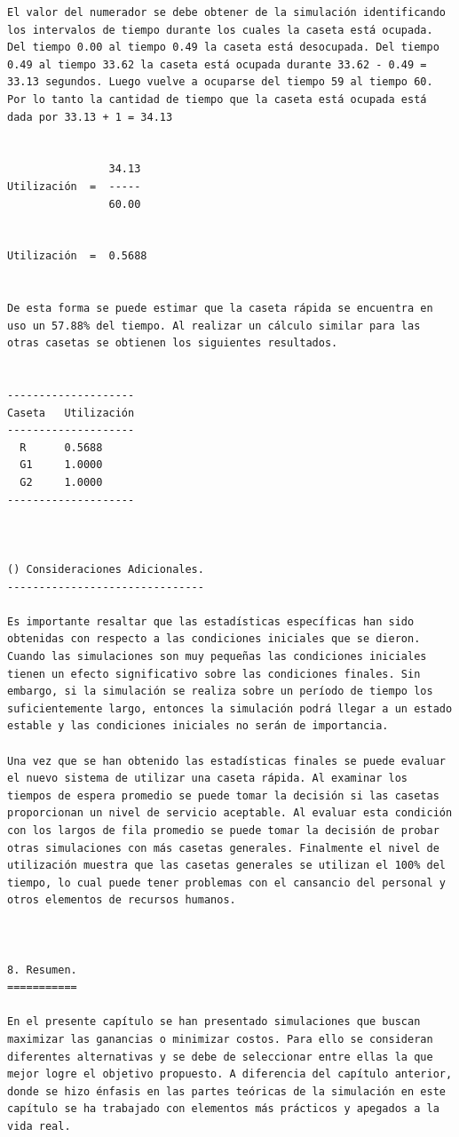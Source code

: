 \begin{verbatim}
El valor del numerador se debe obtener de la simulación identificando los intervalos de tiempo durante los cuales la caseta está ocupada. Del tiempo 0.00 al tiempo 0.49 la caseta está desocupada. Del tiempo 0.49 al tiempo 33.62 la caseta está ocupada durante 33.62 - 0.49 = 33.13 segundos. Luego vuelve a ocuparse del tiempo 59 al tiempo 60. Por lo tanto la cantidad de tiempo que la caseta está ocupada está dada por 33.13 + 1 = 34.13


                34.13
Utilización  =  -----
                60.00


Utilización  =  0.5688


De esta forma se puede estimar que la caseta rápida se encuentra en uso un 57.88% del tiempo. Al realizar un cálculo similar para las otras casetas se obtienen los siguientes resultados.


--------------------
Caseta   Utilización
--------------------
  R      0.5688
  G1     1.0000
  G2     1.0000
--------------------



() Consideraciones Adicionales.
-------------------------------

Es importante resaltar que las estadísticas específicas han sido obtenidas con respecto a las condiciones iniciales que se dieron. Cuando las simulaciones son muy pequeñas las condiciones iniciales tienen un efecto significativo sobre las condiciones finales. Sin embargo, si la simulación se realiza sobre un período de tiempo los suficientemente largo, entonces la simulación podrá llegar a un estado estable y las condiciones iniciales no serán de importancia.

Una vez que se han obtenido las estadísticas finales se puede evaluar el nuevo sistema de utilizar una caseta rápida. Al examinar los tiempos de espera promedio se puede tomar la decisión si las casetas proporcionan un nivel de servicio aceptable. Al evaluar esta condición con los largos de fila promedio se puede tomar la decisión de probar otras simulaciones con más casetas generales. Finalmente el nivel de utilización muestra que las casetas generales se utilizan el 100% del tiempo, lo cual puede tener problemas con el cansancio del personal y otros elementos de recursos humanos.



8. Resumen.
===========

En el presente capítulo se han presentado simulaciones que buscan maximizar las ganancias o minimizar costos. Para ello se consideran diferentes alternativas y se debe de seleccionar entre ellas la que mejor logre el objetivo propuesto. A diferencia del capítulo anterior, donde se hizo énfasis en las partes teóricas de la simulación en este capítulo se ha trabajado con elementos más prácticos y apegados a la vida real.


\end{verbatim}

